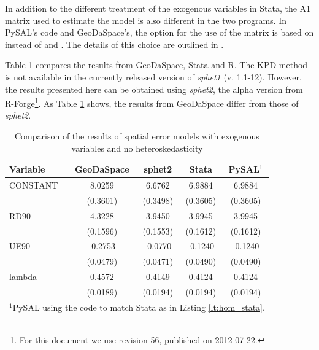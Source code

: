 \documentclass{article}
\begin{document}
In addition to the different treatment of the exogenous variables in Stata, the A1 matrix used to estimate the model is also different in the two programs. In PySAL's code and GeoDaSpace's, the option for the use of the matrix is based on \citet{Arraiz10} instead of \citet{Drukker10} and \citet{Drukker11}. The details of this choice are outlined in \citet{Anselin11}.  

Table \ref{t:res_hom} compares the results from GeoDaSpace, Stata and R. The KPD method is not available in the currently released version of \emph{sphet1} (v. 1.1-12). However, the results presented here can be obtained using \emph{sphet2}, the alpha version from R-Forge\footnote{For this document we use revision 56, published on 2012-07-22.}. As Table \ref{t:res_hom} shows, the results from GeoDaSpace differ from those of \emph{sphet2}. 

\begin{table}[htpb]
\caption{Comparison of the results of spatial error models with exogenous variables and no heteroskedasticity}
\label{t:res_hom}
\centering
\begin{small}
\begin{tabular}{l|cccc} \hline
\textbf{Variable}&\textbf{GeoDaSpace}&\textbf{sphet2}&\textbf{Stata}&\textbf{PySAL$^1$}\\ \hline
CONSTANT&8.0259&6.6762&6.9884&6.9884\\
&(0.3601)&(0.3498)&(0.3605)&(0.3605)\\
RD90&4.3228&3.9450&3.9945&3.9945\\
&(0.1596)&(0.1553)&(0.1612)&(0.1612)\\
UE90&-0.2753&-0.0770&-0.1240&-0.1240\\
&(0.0479)&(0.0471)&(0.0490)&(0.0490)\\
lambda&0.4572&0.4149&0.4124&0.4124\\
&(0.0189)&(0.0194)&(0.0194)&(0.0194)\\
\hline
\multicolumn{5}{l}{\scriptsize{$^1$PySAL using the code to match Stata as in Listing \ref{lt:hom_stata}.}} \\
\end{tabular}
\end{small}
\end{table}
\end{document}
